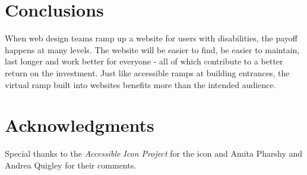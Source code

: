 \documentclass{acm_proc_article-sp}
\begin{document}
\section{Conclusions}
When web design teams ramp up a website for users with disabilities, the payoff happens at many levels. The website will be easier to find, be easier to maintain, last longer and work better for everyone - all of which contribute to a better return on the investment. Just like accessible ramps at building entrances, the virtual ramp built into websites benefits more than the intended audience.

\section{Acknowledgments}
Special thanks to the {\it Accessible Icon Project} for the icon and Amita Pharshy and Andrea Quigley for their comments.

\end{document}
